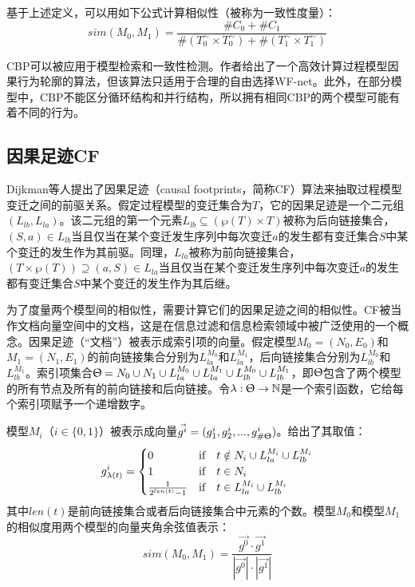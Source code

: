 基于上述定义，可以用如下公式计算相似性（被称为一致性度量）：
\begin{displaymath}
  sim(M_{0},M_{1})=\frac{\#C_{0}+\#C_{1}}{\#(T_{0}^{\sim}\times T_{0}^{\sim})+\#(T_{1}^{\sim}\times T_{1}^{\sim})}
\end{displaymath}

CBP可以被应用于模型检索和一致性检测。作者给出了一个高效计算过程模型因果行为轮廓的算法\cite{weidlich2010efficient}，但该算法只适用于合理的自由选择WF-net。此外，在部分模型中，CBP不能区分循环结构和并行结构，所以拥有相同CBP的两个模型可能有着不同的行为。

\subsection{因果足迹CF}\label{subsec:cf}
Dijkman等人提出了因果足迹（causal footprints，简称CF）算法来抽取过程模型变迁之间的前驱关系\cite{dijkman2011similarity}。假定过程模型的变迁集合为$T$，它的因果足迹是一个二元组$(L_{lb},L_{la})$。该二元组的第一个元素$L_{lb}\subseteq (\wp(T)\times T)$被称为后向链接集合，$(S,a)\in L_{lb}$当且仅当在某个变迁发生序列中每次变迁$a$的发生都有变迁集合$S$中某个变迁的发生作为其前驱。同理，$L_{la}$被称为前向链接集合，$(T\times\wp(T))\supseteq(a,S)\in L_{la}$当且仅当在某个变迁发生序列中每次变迁$a$的发生都有变迁集合$S$中某个变迁的发生作为其后继。

为了度量两个模型间的相似性，需要计算它们的因果足迹之间的相似性。CF被当作文档向量空间中的文档，这是在信息过滤和信息检索领域中被广泛使用的一个概念\cite{salton1975vector}。因果足迹（“文档”）被表示成索引项的向量。假定模型$M_{0}=(N_{0},E_{0})$和$M_{1}=(N_{1},E_{1})$的前向链接集合分别为$L_{la}^{M_{0}}$和$L_{la}^{M_{1}}$，后向链接集合分别为$L_{lb}^{M_{0}}$和$L_{lb}^{M_{1}}$。索引项集合$\Uptheta=N_{0}\cup N_{1}\cup L_{la}^{M_{0}}\cup L_{la}^{M_{1}}\cup L_{lb}^{M_{0}}\cup L_{lb}^{M_{1}}$，即$\Uptheta$包含了两个模型的所有节点及所有的前向链接和后向链接。令$\lambda:\Uptheta\rightarrow\mathbb{N}$是一个索引函数，它给每个索引项赋予一个递增数字。

模型$M_{i}$（$i\in\{0,1\}$）被表示成向量$\vec{g^{i}}=(g_{1}^{i},g_{2}^{i},...,g_{\#\Uptheta}^{i})$。给出了其取值：
\begin{displaymath}
  g{_{\lambda(t)}^i}=
    \begin{cases}
        0& \textnormal{if\quad} t\notin N_i\cup L{_{la}^{M_i}}\cup L{_{lb}^{M_i}}\\
        1& \textnormal{if\quad} t\in N_i\\
        \frac{1}{2^{len(t)}-1}& \textnormal{if\quad} t\in L{_{la}^{M_i}}\cup L{_{lb}^{M_i}}
    \end{cases}
\end{displaymath}
其中$len(t)$是前向链接集合或者后向链接集合中元素的个数。模型$M_{0}$和模型$M_{1}$的相似度用两个模型的向量夹角余弦值表示：
\begin{displaymath}
  sim(M_{0},M_{1})=\frac{\vec{g^{0}}\cdot\vec{g^{1}}}{|\vec{g^{0}}|\cdot|\vec{g^{1}}|}
\end{displaymath}

